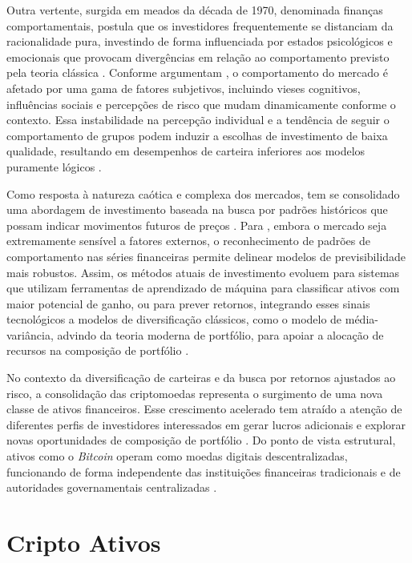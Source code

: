 Outra vertente, surgida em meados da década de 1970, denominada finanças comportamentais, postula que os investidores frequentemente se distanciam da racionalidade pura, investindo de forma influenciada por estados psicológicos e emocionais que provocam divergências em relação ao comportamento previsto pela teoria clássica \cite{adil2022financial}. Conforme argumentam , o comportamento do mercado é afetado por uma gama de fatores subjetivos, incluindo vieses cognitivos, influências sociais e percepções de risco que mudam dinamicamente conforme o contexto. Essa instabilidade na percepção individual e a tendência de seguir o comportamento de grupos podem induzir a escolhas de investimento de baixa qualidade, resultando em desempenhos de carteira inferiores aos modelos puramente lógicos \cite{adil2022financial,almansour2023behavioral}.

Como resposta à natureza caótica e complexa dos mercados, tem se consolidado uma abordagem de investimento baseada na busca por padrões históricos que possam indicar movimentos futuros de preços \cite{paiva2019decision}. Para , embora o mercado seja extremamente sensível a fatores externos, o reconhecimento de padrões de comportamento nas séries financeiras permite delinear modelos de previsibilidade mais robustos. Assim, os métodos atuais de investimento evoluem para sistemas que utilizam ferramentas de aprendizado de máquina para classificar ativos com maior potencial de ganho, ou para prever retornos, integrando esses sinais tecnológicos a modelos de diversificação clássicos, como o modelo de média-variância, advindo da teoria moderna de portfólio, para apoiar a alocação de recursos na composição de portfólio \cite{wang2020portfolio}.

No contexto da diversificação de carteiras e da busca por retornos ajustados ao risco, a consolidação das criptomoedas representa o surgimento de uma nova classe de ativos financeiros. Esse crescimento acelerado tem atraído a atenção de diferentes perfis de investidores interessados em gerar lucros adicionais e explorar novas oportunidades de composição de portfólio \cite{charfeddine2020investigating}. Do ponto de vista estrutural, ativos como o \textit{Bitcoin} operam como moedas digitais descentralizadas, funcionando de forma independente das instituições financeiras tradicionais e de autoridades governamentais centralizadas \cite{umar2021bitcoin}.

\section{Cripto Ativos}
\label{sec_cripto_ativos}

